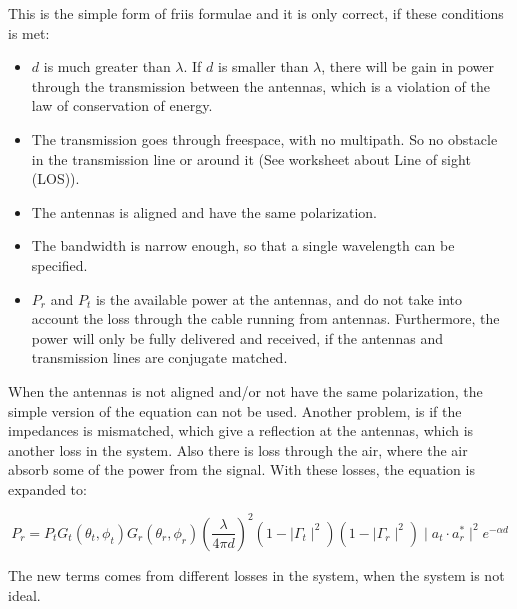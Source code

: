 This is the simple form of friis formulae and it is only correct, if these conditions is met:
\begin{itemize}
\item $d$ is much greater than $\lambda$. If $d$ is smaller than $\lambda$, there will be gain in power through the transmission between the antennas, which is a violation of the law of conservation of energy.
\item The transmission goes through freespace, with no multipath. So no obstacle in the transmission line or around it (See worksheet about Line of sight (LOS)).
\item The antennas is aligned and have the same polarization.
\item The bandwidth is narrow enough, so that a single wavelength can be specified.
\item $P_r$ and $P_t$ is the available power at the antennas, and do not take into account the loss through the cable running from antennas. Furthermore, the power will only be fully delivered and received, if the antennas and transmission lines are conjugate matched.
\end{itemize}


When the antennas is not aligned and/or not have the same polarization, the simple version of the equation can not be used. Another problem, is if the impedances is mismatched, which give a reflection at the antennas, which is another loss in the system. Also there is loss through the air, where the air absorb some of the power from the signal. With these losses, the equation is expanded to:

\begin{equation}
P_r = P_t G_t(\theta_t, \phi_t) G_r(\theta_r, \phi_r) (\frac{\lambda}{4 \pi d})^2 (1 - \mid \Gamma_t \mid^2) (1 - \mid \Gamma_r \mid^2) \mid a_t \cdot a_r^* \mid^2 e^{- \alpha d}
\end{equation}
\begin{where}
\end{where}

The new terms comes from different losses in the system, when the system is not ideal.




